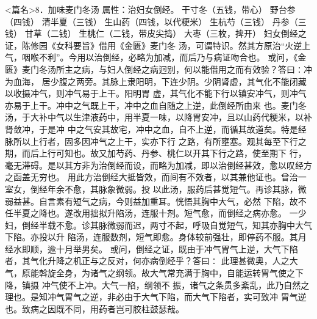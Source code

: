 \documentclass[a4paper,12pt,UTF8,twoside]{ctexbook}
\begin{document}
<篇名>8．加味麦门冬汤
属性：治妇女倒经。 
干寸冬（五钱，带心） 野台参（四钱） 清半夏（三钱） 生山药（四钱，以代粳米） 生杭芍（三钱） 
丹参（三钱） 甘草（二钱） 生桃仁（二钱，带皮尖捣） 大枣（三枚，捭开） 
妇女倒经之证，陈修园《女科要旨》借用《金匮》麦门冬 
汤，可谓特识。然其方原治“火逆上气，咽喉不利”。今用以治倒经，必略为加减，而后乃与病证吻合也。 
或问，《金匮》麦门冬汤所主之病，与妇人倒经之病迥别，何以能借用之而有效验？答曰∶冲为血海， 
居少腹之两旁。其脉上隶阳明，下连少阴。少阴肾虚，其气化不能闭藏以收摄冲气，则冲气易于上干。阳明胃 
虚，其气化不能下行以镇安冲气，则冲气亦易于上干。冲中之气既上干，冲中之血自随之上逆，此倒经所由来 
也。麦门冬汤，于大补中气以生津液药中，用半夏一味，以降胃安冲，且以山药代粳米，以补肾敛冲，于是冲 
中之气安其故宅，冲中之血，自不上逆，而循其故道矣。特是经脉所以上行者，固多因冲气之上干，实亦下行 
之路，有所壅塞。观其每至下行之期，而后上行可知也。故又加芍药、丹参、桃仁以开其下行之路，使至期下 
行，毫无滞碍。是以其方非为治倒经而设，而略为加减，即以治倒经甚效，愈以叹经方之函盖无穷也。 
用此方治倒经大抵皆效，而间有不效者，以其兼他证也。曾治一室女，倒经年余不愈，其脉象微弱。投 
以此汤，服药后甚觉短气。再诊其脉，微弱益甚。自言素有短气之病，今则益加重耳。恍悟其胸中大气，必然 
下陷，故不任半夏之降也。遂改用拙拟升陷汤，连服十剂。短气愈，而倒经之病亦愈。 
一少妇，倒经半载不愈。诊其脉微弱而迟，两寸不起，呼吸自觉短气，知其亦胸中大气下陷。亦投以升 
陷汤，连服数剂，短气即愈。身体较前强壮，即停药不服。其月经水即顺，逾十月举男矣。 
或问，倒经之证，既由于冲气胃气上逆，大气下陷者，其气化升降之机正与之反对，何亦病倒经乎？答曰∶ 
此理甚微奥，人之大气，原能斡旋全身，为诸气之纲领。故大气常充满于胸中，自能运转胃气使之下降，镇摄 
冲气使不上冲。大气一陷，纲领不 
振，诸气之条贯多紊乱，此乃自然之理也。是知冲气胃气之逆，非必由于大气下陷，而大气下陷者，实可致冲 
胃气逆也。致病之因既不同，用药者岂可胶柱鼓瑟哉。 
\end{document}
